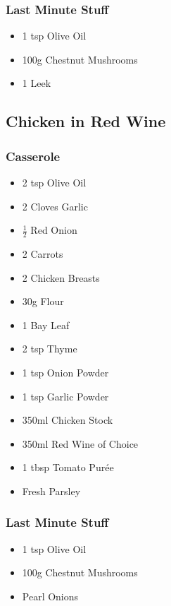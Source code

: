 \documentclass[11pt, english]{article}
\begin{document}
		\subsubsection*{Last Minute Stuff}

	\begin{itemize}
	\setlength\itemsep{0cm}
		\item 1 tsp Olive Oil
		\item 100g Chestnut Mushrooms
		\item 1 Leek
	\end{itemize}

\newpage

	\subsection{Chicken in Red Wine}

		\subsubsection*{Casserole}

	\begin{itemize}
	\setlength\itemsep{0cm}
		\item 2 tsp Olive Oil
		\item 2 Cloves Garlic
		\item $\frac{1}{2}$ Red Onion
		\item 2 Carrots
		\item 2 Chicken Breasts
		\item 30g Flour
		\item 1 Bay Leaf
		\item 2 tsp Thyme
		\item 1 tsp Onion Powder
		\item 1 tsp Garlic Powder
		\item 350ml Chicken Stock
		\item 350ml Red Wine of Choice
		\item 1 tbsp Tomato Pur\'{e}e 
		\item Fresh Parsley
	\end{itemize}

		\subsubsection*{Last Minute Stuff}

	\begin{itemize}
	\setlength\itemsep{0cm}
		\item 1 tsp Olive Oil
		\item 100g Chestnut Mushrooms
		\item Pearl Onions
	\end{itemize}
\end{document}
